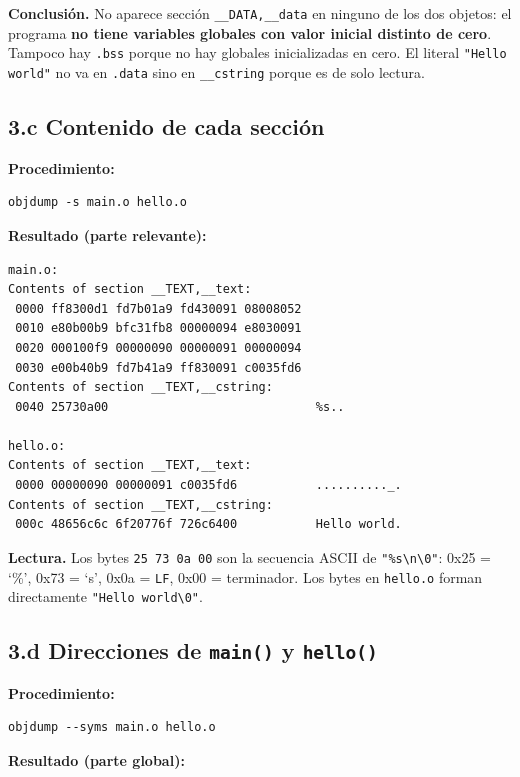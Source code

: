 \documentclass[11pt,a4paper]{article}
\begin{document}
\textbf{Conclusión.} No aparece sección \texttt{\_\_DATA,\_\_data} en
ninguno de los dos objetos: el programa \textbf{no tiene variables
globales con valor inicial distinto de cero}. Tampoco hay
\texttt{.bss} porque no hay globales inicializadas en cero. El literal
\texttt{"Hello world"} no va en \texttt{.data} sino en
\texttt{\_\_cstring} porque es de solo lectura.

\subsection*{3.c Contenido de cada sección}

\textbf{Procedimiento:}

\begin{lstlisting}
objdump -s main.o hello.o
\end{lstlisting}

\textbf{Resultado (parte relevante):}

\begin{lstlisting}[style=asmstyle]
main.o:
Contents of section __TEXT,__text:
 0000 ff8300d1 fd7b01a9 fd430091 08008052
 0010 e80b00b9 bfc31fb8 00000094 e8030091
 0020 000100f9 00000090 00000091 00000094
 0030 e00b40b9 fd7b41a9 ff830091 c0035fd6
Contents of section __TEXT,__cstring:
 0040 25730a00                             %s..

hello.o:
Contents of section __TEXT,__text:
 0000 00000090 00000091 c0035fd6           .........._.
Contents of section __TEXT,__cstring:
 000c 48656c6c 6f20776f 726c6400           Hello world.
\end{lstlisting}

\textbf{Lectura.} Los bytes \texttt{25 73 0a 00} son la secuencia
ASCII de \texttt{"\%s\textbackslash n\textbackslash 0"}: 0x25 = `\%',
0x73 = `s', 0x0a = \texttt{LF}, 0x00 = terminador. Los bytes en
\texttt{hello.o} forman directamente \texttt{"Hello world\textbackslash 0"}.

\subsection*{3.d Direcciones de \texttt{main()} y \texttt{hello()}}

\textbf{Procedimiento:}

\begin{lstlisting}
objdump --syms main.o hello.o
\end{lstlisting}

\textbf{Resultado (parte global):}
\end{document}
